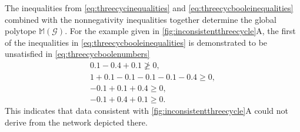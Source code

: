 The inequalities from \ref{eq:threecycinequalities} and \ref{eq:threecycbooleinequalities} combined with the nonnegativity inequalities together determine the global polytope $\mathbb{M}(\mathcal{G})$. For the example given in \ref{fig:inconsistentthreecycle}A, the first of the inequalities in \ref{eq:threecycbooleinequalities} is demonstrated to be unsatisfied in \ref{eq:threecycboolenumbers}
\begin{equation}
\begin{aligned}\label{eq:threecycboolenumbers}
0.1 - 0.4 + 0.1 \not\geq 0, \\
1 + 0.1 - 0.1 - 0.1 - 0.1 - 0.4 \geq 0, \\
-0.1 + 0.1 + 0.4 \geq 0, \\
-0.1 + 0.4 + 0.1 \geq 0.
\end{aligned}
\end{equation}
This indicates that data consistent with \ref{fig:inconsistentthreecycle}A could not derive from the network depicted there.
